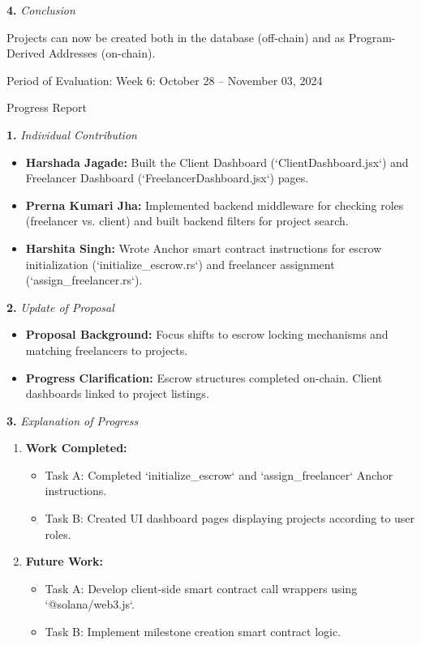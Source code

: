\documentclass[12pt]{article}
\newcommand{\phasetitle}[1]{{\large Period of Evaluation: #1}\par\vspace{4pt}}
\newcommand{\progressreport}{{\large Progress Report}\par\vspace{4pt}}
\newcommand{\subhead}[2]{\textbf{#1.} \textit{#2}\par}
\begin{document}
\subhead{4}{Conclusion}
Projects can now be created both in the database (off-chain) and as Program-Derived Addresses (on-chain).

\newpage

\phasetitle{Week 6: October 28 -- November 03, 2024}

\progressreport

\subhead{1}{Individual Contribution}
\begin{itemize}[leftmargin=2em]
    \item \textbf{Harshada Jagade:} Built the Client Dashboard (`ClientDashboard.jsx`) and Freelancer Dashboard (`FreelancerDashboard.jsx`) pages.
    \item \textbf{Prerna Kumari Jha:} Implemented backend middleware for checking roles (freelancer vs. client) and built backend filters for project search.
    \item \textbf{Harshita Singh:} Wrote Anchor smart contract instructions for escrow initialization (`initialize\_escrow.rs`) and freelancer assignment (`assign\_freelancer.rs`).
\end{itemize}

\subhead{2}{Update of Proposal}
\begin{itemize}[leftmargin=2em]
    \item \textbf{Proposal Background:} Focus shifts to escrow locking mechanisms and matching freelancers to projects.
    \item \textbf{Progress Clarification:} Escrow structures completed on-chain. Client dashboards linked to project listings.
\end{itemize}

\newpage

\subhead{3}{Explanation of Progress}
\begin{enumerate}[leftmargin=2em]
    \item \textbf{Work Completed:}
    \begin{itemize}[leftmargin=2em]
        \item Task A: Completed `initialize\_escrow` and `assign\_freelancer` Anchor instructions.
        \item Task B: Created UI dashboard pages displaying projects according to user roles.
    \end{itemize}
    \item \textbf{Future Work:}
    \begin{itemize}[leftmargin=2em]
        \item Task A: Develop client-side smart contract call wrappers using `@solana/web3.js`.
        \item Task B: Implement milestone creation smart contract logic.
    \end{itemize}
\end{enumerate}
\end{document}
